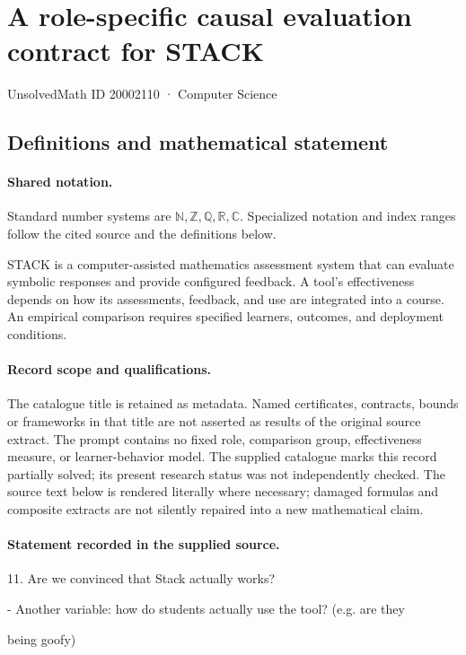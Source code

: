 \documentclass[11pt]{article}
\begin{document}
\setcounter{section}{20002109}
\section{A role-specific causal evaluation contract for STACK}\label{20002110}
{\small\sffamily UnsolvedMath ID 20002110 · Computer Science}
\subsection{Definitions and mathematical statement}

\paragraph{Shared notation.}Standard number systems are $\mathbb N,\mathbb Z,\mathbb Q,\mathbb R,\mathbb C$. Specialized notation and index ranges follow the cited source and the definitions below.


STACK is a computer-assisted mathematics assessment system that can evaluate symbolic responses and provide configured feedback. A tool's effectiveness depends on how its assessments, feedback, and use are integrated into a course. An empirical comparison requires specified learners, outcomes, and deployment conditions.
\paragraph{Record scope and qualifications.}
The catalogue title is retained as metadata. Named certificates, contracts, bounds or frameworks in that title are not asserted as results of the original source extract.
The prompt contains no fixed role, comparison group, effectiveness measure, or learner-behavior model. The supplied catalogue marks this record partially solved; its present research status was not independently checked.
The source text below is rendered literally where necessary; damaged formulas and composite extracts are not silently repaired into a new mathematical claim.
\paragraph{Statement recorded in the supplied source.}
11. Are we convinced that Stack actually works?

- Another variable: how do students actually use the tool? (e.g. are they

being goofy)
\end{document}
